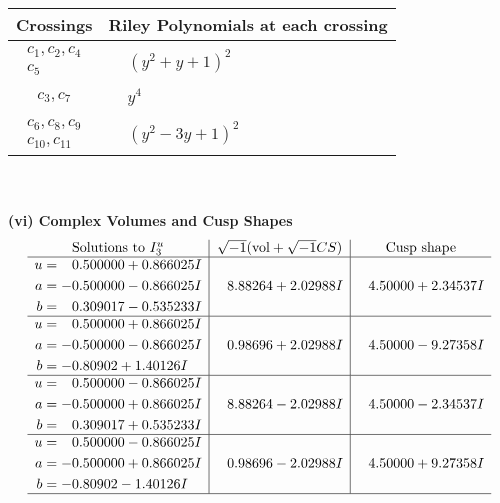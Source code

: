 \documentclass[1p]{elsarticle_modified}
\theoremstyle{definition}
\newcommand{\I}{\sqrt{-1}}
\begin{document}
\begin{tabular}{m{50pt}|m{274pt}}
Crossings & \hspace{64pt}Riley Polynomials at each crossing \\
\hline $$\begin{aligned}c_{1},c_{2},c_{4}\\c_{5}\end{aligned}$$&$\begin{aligned}
&(y^2+y+1)^2
\end{aligned}$\\
\hline $$\begin{aligned}c_{3},c_{7}\end{aligned}$$&$\begin{aligned}
&y^4
\end{aligned}$\\
\hline $$\begin{aligned}c_{6},c_{8},c_{9}\\c_{10},c_{11}\end{aligned}$$&$\begin{aligned}
&(y^2-3 y+1)^2
\end{aligned}$\\
\hline
\end{tabular}\\~\\
\newpage\flushleft \textbf{(vi) Complex Volumes and Cusp Shapes}
$$\begin{array}{c|c|c}  
\text{Solutions to }I^u_{3}& \I (\text{vol} + \sqrt{-1}CS) & \text{Cusp shape}\\
 \hline 
\begin{aligned}
u &= \phantom{-}0.500000 + 0.866025 I \\
a &= -0.500000 - 0.866025 I \\
b &= \phantom{-}0.309017 - 0.535233 I\end{aligned}
 & \phantom{-}8.88264 + 2.02988 I & \phantom{-}4.50000 + 2.34537 I \\ \hline\begin{aligned}
u &= \phantom{-}0.500000 + 0.866025 I \\
a &= -0.500000 - 0.866025 I \\
b &= -0.80902 + 1.40126 I\end{aligned}
 & \phantom{-}0.98696 + 2.02988 I & \phantom{-}4.50000 - 9.27358 I \\ \hline\begin{aligned}
u &= \phantom{-}0.500000 - 0.866025 I \\
a &= -0.500000 + 0.866025 I \\
b &= \phantom{-}0.309017 + 0.535233 I\end{aligned}
 & \phantom{-}8.88264 - 2.02988 I & \phantom{-}4.50000 - 2.34537 I \\ \hline\begin{aligned}
u &= \phantom{-}0.500000 - 0.866025 I \\
a &= -0.500000 + 0.866025 I \\
b &= -0.80902 - 1.40126 I\end{aligned}
 & \phantom{-}0.98696 - 2.02988 I & \phantom{-}4.50000 + 9.27358 I\\
 \hline 
 \end{array}$$\newpage
\end{document}
